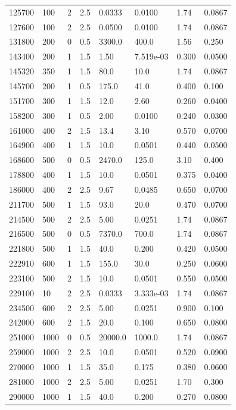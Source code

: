 \documentclass[preview]{standalone}
\begin{document}
{{\begin{tabular}{L{1.2cm}C{1.2cm} C{0.3cm}C{0.5cm} C{1.4cm}C{1.4cm} C{1.4cm}C{1.4cm}}
  125700  &   100  & 2     & 2.5 &  0.0333  & 0.0100  & 1.74 &  0.0867   \\ 
  127600  &   100  & 2     & 2.5 &  0.0500  & 0.0100  & 1.74 &  0.0867   \\ 
  131800  &   200  & 0     & 0.5 &  3300.0  & 400.0  & 1.56 &  0.250   \\ 
  143400  &   200  & 1     & 1.5 &  1.50  & 7.519e-03  & 0.300 &  0.0500   \\ 
  145320  &   350  & 1     & 1.5 &  80.0  & 10.0  & 1.74 &  0.0867   \\ 
  145700  &   200  & 1     & 0.5 &  175.0  & 41.0  & 0.400 &  0.100   \\ 
  151700  &   300  & 1     & 1.5 &  12.0  & 2.60  & 0.260 &  0.0400   \\ 
  158200  &   300  & 1     & 0.5 &  2.00  & 0.0100  & 0.240 &  0.0300   \\ 
  161000  &   400  & 2     & 1.5 &  13.4  & 3.10  & 0.570 &  0.0700   \\ 
  164900  &   400  & 1     & 1.5 &  10.0  & 0.0501  & 0.440 &  0.0500   \\ 
  168600  &   500  & 0     & 0.5 &  2470.0  & 125.0  & 3.10 &  0.400   \\ 
  178800  &   400  & 1     & 1.5 &  10.0  & 0.0501  & 0.375 &  0.0400   \\ 
  186000  &   400  & 2     & 2.5 &  9.67  & 0.0485  & 0.650 &  0.0700   \\ 
  211700  &   500  & 1     & 1.5 &  93.0  & 20.0  & 0.470 &  0.0700   \\ 
  214500  &   500  & 2     & 2.5 &  5.00  & 0.0251  & 1.74 &  0.0867   \\ 
  216500  &   500  & 0     & 0.5 &  7370.0  & 700.0  & 1.74 &  0.0867   \\ 
  221800  &   500  & 1     & 1.5 &  40.0  & 0.200  & 0.420 &  0.0500   \\ 
  222910  &   600  & 1     & 1.5 &  155.0  & 30.0  & 0.250 &  0.0600   \\ 
  223100  &   500  & 2     & 1.5 &  10.0  & 0.0501  & 0.550 &  0.0500   \\ 
  229100  &    10  & 2     & 2.5 &  0.0333  & 3.333e-03  & 1.74 &  0.0867   \\ 
  234500  &   600  & 2     & 2.5 &  5.00  & 0.0251  & 0.900 &  0.100   \\ 
  242000  &   600  & 2     & 1.5 &  20.0  & 0.100  & 0.650 &  0.0800   \\ 
  251000  &  1000  & 0     & 0.5 &  20000.0  & 1000.0  & 1.74 &  0.0867   \\ 
  259000  &  1000  & 2     & 2.5 &  10.0  & 0.0501  & 0.520 &  0.0900   \\ 
  270000  &  1000  & 1     & 1.5 &  35.0  & 0.175  & 0.380 &  0.0600   \\ 
  281000  &  1000  & 2     & 2.5 &  5.00  & 0.0251  & 1.70 &  0.300   \\ 
  290000  &  1000  & 1     & 1.5 &  40.0  & 0.200  & 0.270 &  0.0800   \\ 
\hline 
\end{tabular} 

}}
\end{document}
